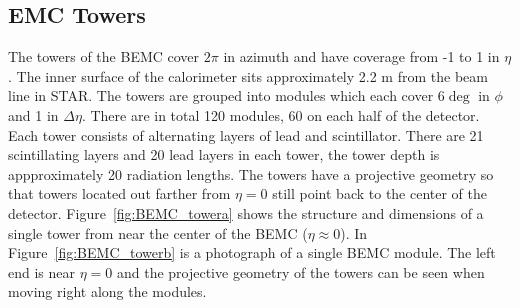 \subsection{EMC Towers}

The towers of the BEMC cover $2\pi$ in azimuth and have coverage from -1 to 1 in $\eta$. The inner surface of the calorimeter sits approximately 2.2 m from the beam line in STAR. The towers are grouped into modules which each cover $6\deg$ in $\phi$ and 1 in $\Delta\eta$. There are in total 120 modules, 60 on each half of the detector. Each tower consists of alternating layers of lead and scintillator. There are 21 scintillating layers and 20 lead layers in each tower, the tower depth is appproximately 20 radiation lengths. The towers have a projective geometry so that towers located out farther from $\eta = 0$ still point back to the center of the detector. Figure~\ref{fig:BEMC_towera} shows the structure and dimensions of a single tower from near the center of the BEMC ($\eta \approx 0$). In Figure~\ref{fig:BEMC_towerb} is a photograph of a single BEMC module. The left end is near $\eta = 0$ and the projective geometry of the towers can be seen when moving right along the modules.

